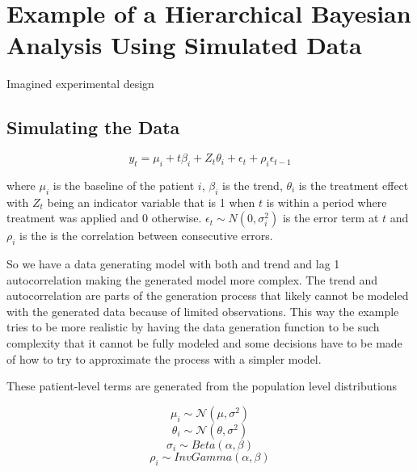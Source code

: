 \documentclass[12pt,a4paper,leqno]{report}
\theoremstyle{plain}
\theoremstyle{definition}
\theoremstyle{remark}
\begin{document}
\chapter{Example of a Hierarchical Bayesian Analysis Using Simulated
  Data}\label{example}

Imagined experimental design

\section{Simulating the Data}

\begin{def}\label{simulationmodel}
    \begin{equation}\label{}
        y_t = \mu_i + t\beta_i + Z_t\theta_i + \epsilon_t + \rho_i\epsilon_{t-1}
    \end{equation}
\end{def}where \(\mu_i\) is the baseline of the patient \(i\), \(\beta_i\) is
the trend, \(\theta_i\) is the treatment effect with \(Z_t\) being an indicator
variable that is 1 when \(t\) is within a period where treatment was applied and
0 otherwise. \(\epsilon_t \sim N(0,\sigma_i^2) \) is the error term at \(t\) and
\(\rho_i\) is the is the correlation between consecutive errors.

So we have a data generating model with both and trend and lag 1 autocorrelation
making the generated model more complex. The trend and autocorrelation are parts
of the generation process that likely cannot be modeled with the generated data
because of limited observations. This way the example tries to be more realistic
by having the data generation function to be such complexity that it cannot be
fully modeled and some decisions have to be made of how to try to approximate
the process with a simpler model.

These patient-level terms are generated from the population level distributions

\begin{def}\label{populationparameters}
    \begin{equation}
        \mu_i \sim \mathcal{N}(\mu,\sigma^2)
    \end{equation}
    \begin{equation}
        \theta_i \sim \mathcal{N}(\theta,\sigma^2)
    \end{equation}
    \begin{equation}
        \sigma_i \sim Beta(\alpha, \beta)
    \end{equation}
    \begin{equation}
        \rho_i \sim InvGamma(\alpha, \beta)
    \end{equation}
\end{def}
\end{document}
